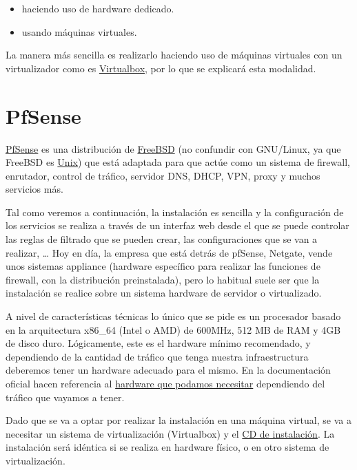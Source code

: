 \begin{itemize}
    \item haciendo uso de hardware dedicado.
    \item usando máquinas virtuales.
\end{itemize}

La manera más sencilla es realizarlo haciendo uso de máquinas virtuales con un virtualizador como es \href{https://www.virtualbox.org/}{Virtualbox}, por lo que se explicará esta modalidad.

\hypertarget{pfsense}{}
\chapter{PfSense}
\href{https://www.pfsense.org/}{PfSense} es una distribución de \href{https://es.wikipedia.org/wiki/FreeBSD}{FreeBSD} (no confundir con GNU/Linux, ya que FreeBSD es \href{https://es.wikipedia.org/wiki/Unix}{Unix}) que está adaptada para que actúe como un sistema de firewall, enrutador, control de tráfico, servidor DNS, DHCP, VPN, proxy y muchos servicios más.

Tal como veremos a continuación, la instalación es sencilla y la configuración de los servicios se realiza a través de un interfaz web desde el que se puede controlar las reglas de filtrado que se pueden crear, las configuraciones que se van a realizar, …
Hoy en día, la empresa que está detrás de pfSense, Netgate, vende unos sistemas appliance (hardware específico para realizar las funciones de firewall, con la distribución preinstalada), pero lo habitual suele ser que la instalación se realice sobre un sistema hardware de servidor o virtualizado.

A nivel de características técnicas lo único que se pide es un procesador basado en la arquitectura x86\_64 (Intel o AMD) de 600MHz, 512 MB de RAM y 4GB de disco duro. Lógicamente, este es el hardware mínimo recomendado, y dependiendo de la cantidad de tráfico que tenga nuestra infraestructura deberemos tener un hardware adecuado para el mismo. En la documentación oficial hacen referencia al \href{https://docs.netgate.com/pfsense/en/latest/hardware/size.html}{hardware que podamos necesitar} dependiendo del tráfico que vayamos a tener.

Dado que se va a optar por realizar la instalación en una máquina virtual, se va a necesitar un sistema de virtualización (Virtualbox) y el \href{https://www.pfsense.org/download/}{CD de instalación}. La instalación será idéntica si se realiza en hardware físico, o en otro sistema de virtualización.

